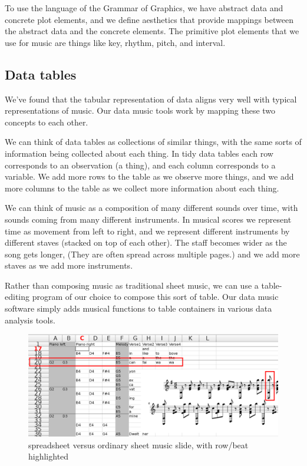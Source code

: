 \documentclass{acm_proc_article-sp}
\begin{document}
To use the language of the Grammar of Graphics, \cite{grammar}
we have abstract data and concrete plot elements,
and we define aesthetics that provide mappings
between the abstract data and the concrete elements.
The primitive plot elements that we use for music are things
like key, rhythm, pitch, and interval.

\subsection{Data tables}
We've found that the tabular representation of data aligns very well with
typical representations of music. Our data music tools work by mapping these
two concepts to each other.

We can think of data tables as collections of similar things, with the
same sorts of information being collected about each thing. In tidy data
tables \cite{tidydata} each row corresponds to an observation (a thing),
and each column corresponds to a variable. We add more rows to the table
as we observe more things, and we add more columns to the table as we
collect more information about each thing.

We can think of music as a composition of many different sounds over time,
with sounds coming from many different instruments. In musical scores
we represent time as movement from left to right, and we represent different
instruments by different staves (stacked on top of each other).
The staff becomes wider as the song gets longer, (They are often spread
across multiple pages.) and we add more staves as we add more instruments.

Rather than composing music as traditional sheet music,
we can use a table-editing program of our choice to compose
this sort of table. Our data music software simply adds
musical functions to table containers in various data analysis
tools.

\begin{figure} \label{highlight}
\centering
\caption{spreadsheet versus ordinary sheet music slide, with row/beat highlighted}
\includegraphics[width=\textwidth]{../sheetmusic/sheetmusic-side-by-side-highlighted-rowbeat.png}
\end{figure}
\end{document}
